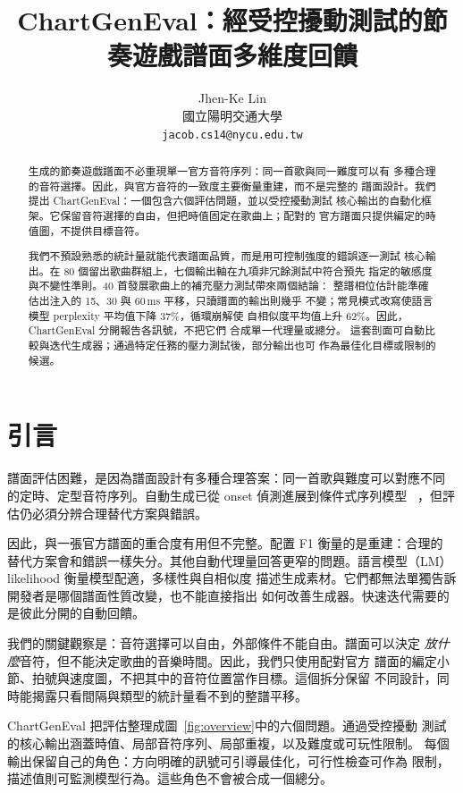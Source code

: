 \documentclass[10pt,twocolumn]{article}
\title{\bfseries ChartGenEval：經受控擾動測試的節奏遊戲譜面多維度回饋}
\author{Jhen-Ke Lin\\
  國立陽明交通大學\\
  \texttt{jacob.cs14@nycu.edu.tw}}
\date{}
\newcommand{\figref}[1]{圖~\ref{#1}}
\begin{document}
\maketitle

\begin{abstract}
生成的節奏遊戲譜面不必重現單一官方音符序列：同一首歌與同一難度可以有
多種合理的音符選擇。因此，與官方音符的一致度主要衡量重建，而不是完整的
譜面設計。我們提出 ChartGenEval：一個包含六個評估問題，並以受控擾動測試
核心輸出的自動化框架。它保留音符選擇的自由，但把時值固定在歌曲上；配對的
官方譜面只提供編定的時值圖，不提供目標音符。

我們不預設熟悉的統計量就能代表譜面品質，而是用可控制強度的錯誤逐一測試
核心輸出。在 80 個留出歌曲群組上，七個輸出軸在九項非冗餘測試中符合預先
指定的敏感度與不變性準則。40 首發展歌曲上的補充壓力測試帶來兩個結論：
整譜相位估計能準確估出注入的 15、30 與 60\,ms 平移，只讀譜面的輸出則幾乎
不變；常見模式改寫使語言模型 perplexity 平均值下降 37\%，循環崩解使
自相似度平均值上升 62\%。因此，ChartGenEval 分開報告各訊號，不把它們
合成單一代理量或總分。
這套剖面可自動比較與迭代生成器；通過特定任務的壓力測試後，部分輸出也可
作為最佳化目標或限制的候選。
\end{abstract}

\section{引言}\label{sec:intro}

譜面評估困難，是因為譜面設計有多種合理答案：同一首歌與難度可以對應不同
的定時、定型音符序列。自動生成已從 onset 偵測進展到條件式序列模型
~\cite{donahue2017ddc,halina2021taikonation,takada2023genelive,
hanzen2025tcp}，但評估仍必須分辨合理替代方案與錯誤。

因此，與一張官方譜面的重合度有用但不完整。配置 F1 衡量的是重建：合理的
替代方案會和錯誤一樣失分。其他自動代理量回答更窄的問題。語言模型（LM）
likelihood 衡量模型配適，多樣性與自相似度
描述生成素材。它們都無法單獨告訴開發者是哪個譜面性質改變，也不能直接指出
如何改善生成器。快速迭代需要的是彼此分開的自動回饋。

我們的關鍵觀察是：音符選擇可以自由，外部條件不能自由。譜面可以決定
\emph{放什麼}音符，但不能決定歌曲的音樂時間。因此，我們只使用配對官方
譜面的編定小節、拍號與速度圖，不把其中的音符位置當作目標。這個拆分保留
不同設計，同時能揭露只看間隔與類型的統計量看不到的整譜平移。

ChartGenEval 把評估整理成\figref{fig:overview}中的六個問題。通過受控擾動
測試的核心輸出涵蓋時值、局部音符序列、局部重複，以及難度或可玩性限制。
每個輸出保留自己的角色：方向明確的訊號可引導最佳化，可行性檢查可作為
限制，描述值則可監測模型行為。這些角色不會被合成一個總分。
\end{document}
